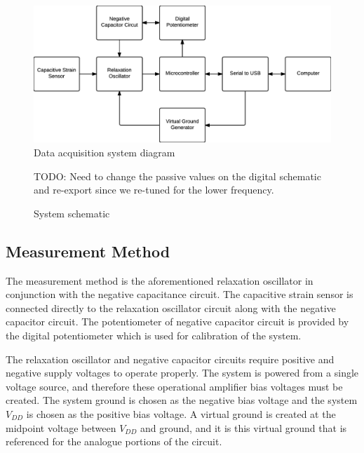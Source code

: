 \begin{figure}
	\begin{center}
		\includegraphics{Images/system-diagram.png}
		\caption{Data acquisition system diagram}\label{daq-system-fig}
	\end{center}
\end{figure}

\begin{figure}
	\begin{center}
		TODO: Need to change the passive values on the digital schematic and re-export since we re-tuned for the lower frequency.
		\caption{System schematic}\label{daq-schematic-fig}
	\end{center}
\end{figure}

\subsection{Measurement Method}
The measurement method is the aforementioned relaxation oscillator in conjunction with the negative capacitance circuit.  The capacitive strain sensor is connected directly to the relaxation oscillator circuit along with the negative capacitor circuit.  The potentiometer of negative capacitor circuit is provided by the digital potentiometer which is used for calibration of the system.  

The relaxation oscillator and negative capacitor circuits require positive and negative supply voltages to operate properly.  The system is powered from a single voltage source, and therefore these operational amplifier bias voltages must be created.  The system ground is chosen as the negative bias voltage and the system $V_{DD}$ is chosen as the positive bias voltage.  A virtual ground is created at the midpoint voltage between $V_{DD}$ and ground, and it is this virtual ground that is referenced for the analogue portions of the circuit.

